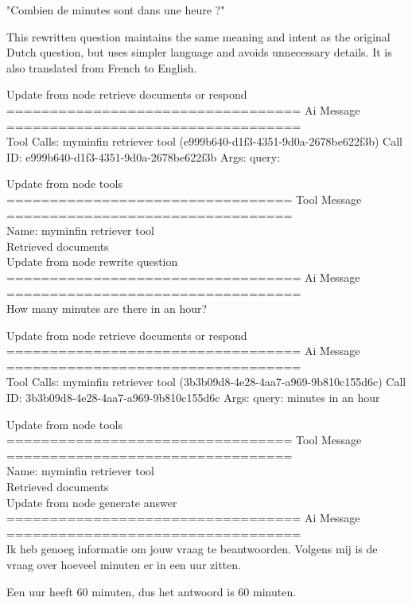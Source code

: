"Combien de minutes sont dans une heure ?"

This rewritten question maintains the same meaning and intent as the original Dutch question, but uses simpler language and avoids unnecessary details. It is also translated from French to English.



Update from node retrieve  documents  or  respond
\\[1em]
================================== Ai Message ==================================
\\[1em]
Tool Calls:
myminfin  retriever  tool (e999b640-d1f3-4351-9d0a-2678be622f3b)
Call ID: e999b640-d1f3-4351-9d0a-2678be622f3b
Args:
query:



Update from node tools
\\[1em]
================================= Tool Message =================================
\\[1em]
Name: myminfin  retriever  tool
\\[1em]
Retrieved documents
\\[1em]
Update from node rewrite  question
\\[1em]
================================== Ai Message ==================================
\\[1em]

How many minutes are there in an hour?



Update from node retrieve  documents  or  respond
\\[1em]
================================== Ai Message ==================================
\\[1em]
Tool Calls:
myminfin  retriever  tool (3b3b09d8-4e28-4aa7-a969-9b810c155d6c)
Call ID: 3b3b09d8-4e28-4aa7-a969-9b810c155d6c
Args:
query: minutes in an hour



Update from node tools
\\[1em]
================================= Tool Message =================================
\\[1em]
Name: myminfin  retriever  tool
\\[1em]
Retrieved documents
\\[1em]

Update from node generate  answer
\\[1em]
================================== Ai Message ==================================
\\[1em]

Ik heb genoeg informatie om jouw vraag te beantwoorden. Volgens mij is de vraag over hoeveel minuten er in een uur zitten.

Een uur heeft 60 minuten, dus het antwoord is 60 minuten.



